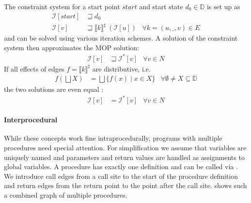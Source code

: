 The constraint system for a start point $start$ and start state $d_0 \in \mathbb{D}$ is set up as
\begin{align}
\mathcal{I}[start] &\sqsupseteq d_0\\
\mathcal{I}[v]	   &\sqsupseteq \llbracket k \rrbracket^\sharp \; (\mathcal{I}[u])	&\forall k = (u, \_, v) \in E
\end{align}
and can be solved using various iteration schemes.
A solution of the constraint system then approximates the MOP solution:
\begin{align}
\mathcal{I}[v]	   &\sqsupseteq \mathcal{I}^*[v] &\forall v \in N
\end{align}
If all effects of edges $f = \llbracket k \rrbracket^\sharp$ are distributive, i.e.
\begin{align}
f(\bigsqcup X) 	   &= \bigsqcup \{f(x) \; | \; x \in X\} 	&\forall \emptyset \neq X \subseteq \mathbb{D}
\end{align}
the two solutions are even equal \cite{Kildall:1973:UAG:512927.512945}:
\begin{align}
\mathcal{I}[v]	   &= \mathcal{I}^*[v] &\forall v \in N
\end{align}

\paragraph*{Interprocedural}
While these concepts work fine intraprocedurally, programs with multiple procedures need special attention.
For simplification we assume that variables are uniquely named and parameters and return values are handled as assignments to global variables.
A procedure  has exactly one definition  and can be called via .
We introduce call edges from a call site to the start of the procedure definition and return edges from the return point to the point after the call site.
 shows such a combined graph of multiple procedures.

